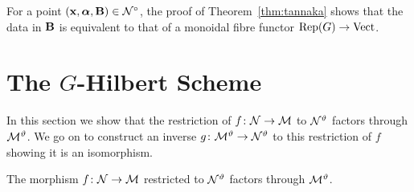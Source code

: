 \documentclass{amsart}
\newcommand{\balpha}{\boldsymbol{\alpha}}
\theoremstyle{definition}
\begin{document}
\begin{remark}
For a point $(\bfx, \balpha, \bfB) \in \cN^\circ$, the proof of Theorem~\ref{thm:tannaka} shows that the data in $\mathbf{B}$ is equivalent to that of a monoidal fibre functor $\operatorname{Rep}(G) \rightarrow \operatorname{Vect}$.
\end{remark}

\section{The $G$-Hilbert Scheme}
In this section we show that the restriction of $f \colon \mathcal{N} \rightarrow \mathcal{M}$ to $\mathcal{N}^\vartheta$ factors through $\mathcal{M}^\vartheta$.
We go on to construct an inverse $g \colon \mathcal{M}^\vartheta \rightarrow \mathcal{N}^\vartheta$ to this restriction of $f$ showing it is an isomorphism.


\begin{lemma}
The morphism $f \colon \mathcal{N} \rightarrow \mathcal{M}$ restricted to $\mathcal{N}^\vartheta$ factors through $\mathcal{M}^\vartheta$.
\end{lemma}
\end{document}

